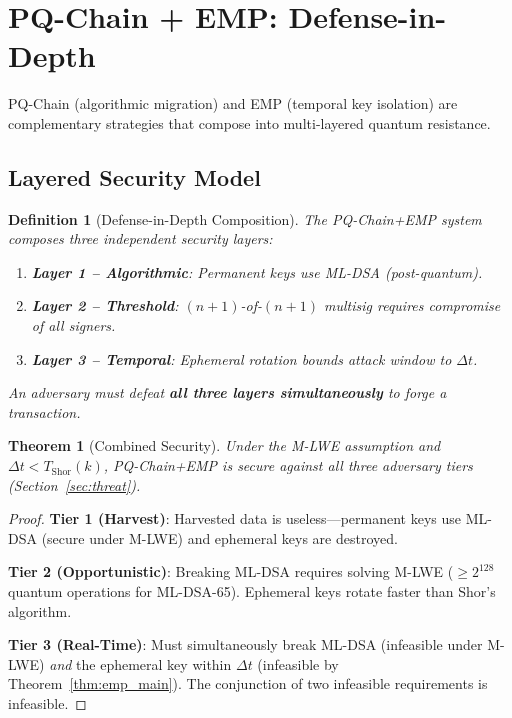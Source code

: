 \documentclass[12pt, a4paper, twocolumn]{article}
\newtheorem{definition}{Definition}
\newtheorem{theorem}{Theorem}
\begin{document}
\section{PQ-Chain + EMP: Defense-in-Depth}
\label{sec:combined}

PQ-Chain (algorithmic migration) and EMP (temporal key isolation) are complementary strategies that compose into multi-layered quantum resistance.

\subsection{Layered Security Model}

\begin{definition}[Defense-in-Depth Composition]
The PQ-Chain+EMP system composes three independent security layers:
\begin{enumerate}[noitemsep]
  \item \textbf{Layer 1 -- Algorithmic}: Permanent keys use ML-DSA (post-quantum).
  \item \textbf{Layer 2 -- Threshold}: $(n+1)$-of-$(n+1)$ multisig requires compromise of all signers.
  \item \textbf{Layer 3 -- Temporal}: Ephemeral rotation bounds attack window to $\Delta t$.
\end{enumerate}
An adversary must defeat \textbf{all three layers simultaneously} to forge a transaction.
\end{definition}

\begin{theorem}[Combined Security]
Under the M-LWE assumption and $\Delta t < T_{\text{Shor}}(k)$, PQ-Chain+EMP is secure against all three adversary tiers (Section~\ref{sec:threat}).
\end{theorem}

\begin{proof}
\textbf{Tier 1 (Harvest)}: Harvested data is useless---permanent keys use ML-DSA (secure under M-LWE) and ephemeral keys are destroyed.

\textbf{Tier 2 (Opportunistic)}: Breaking ML-DSA requires solving M-LWE ($\geq 2^{128}$ quantum operations for ML-DSA-65). Ephemeral keys rotate faster than Shor's algorithm.

\textbf{Tier 3 (Real-Time)}: Must simultaneously break ML-DSA (infeasible under M-LWE) \emph{and} the ephemeral key within $\Delta t$ (infeasible by Theorem~\ref{thm:emp_main}). The conjunction of two infeasible requirements is infeasible.
\end{proof}
\end{document}

